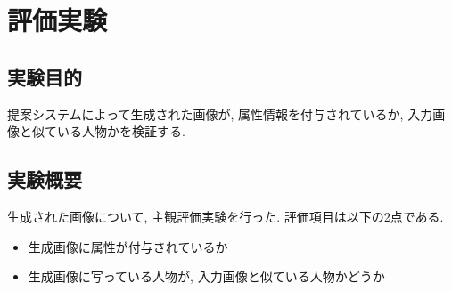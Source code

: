 \chapter{評価実験}

\section{実験目的}
提案システムによって生成された画像が, 属性情報を付与されているか, 入力画像と似ている人物かを検証する. 



\section{実験概要}
生成された画像について, 主観評価実験を行った. 評価項目は以下の2点である. 

\begin{itemize}
  \item 生成画像に属性が付与されているか
  \item 生成画像に写っている人物が, 入力画像と似ている人物かどうか
\end{itemize}

